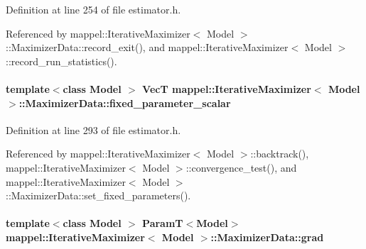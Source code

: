Definition at line 254 of file estimator.\+h.



Referenced by mappel\+::\+Iterative\+Maximizer$<$ Model $>$\+::\+Maximizer\+Data\+::record\+\_\+exit(), and mappel\+::\+Iterative\+Maximizer$<$ Model $>$\+::record\+\_\+run\+\_\+statistics().

\paragraph[{\texorpdfstring{fixed\+\_\+parameter\+\_\+scalar}{fixed_parameter_scalar}}]{\setlength{\rightskip}{0pt plus 5cm}template$<$class Model $>$ {\bf VecT} {\bf mappel\+::\+Iterative\+Maximizer}$<$ Model $>$\+::Maximizer\+Data\+::fixed\+\_\+parameter\+\_\+scalar}\hypertarget{classmappel_1_1IterativeMaximizer_1_1MaximizerData_af078e8d5506273857fd7c2ffad69f8da}{}\label{classmappel_1_1IterativeMaximizer_1_1MaximizerData_af078e8d5506273857fd7c2ffad69f8da}


Definition at line 293 of file estimator.\+h.



Referenced by mappel\+::\+Iterative\+Maximizer$<$ Model $>$\+::backtrack(), mappel\+::\+Iterative\+Maximizer$<$ Model $>$\+::convergence\+\_\+test(), and mappel\+::\+Iterative\+Maximizer$<$ Model $>$\+::\+Maximizer\+Data\+::set\+\_\+fixed\+\_\+parameters().

\paragraph[{\texorpdfstring{grad}{grad}}]{\setlength{\rightskip}{0pt plus 5cm}template$<$class Model $>$ {\bf ParamT}$<$Model$>$ {\bf mappel\+::\+Iterative\+Maximizer}$<$ Model $>$\+::Maximizer\+Data\+::grad}\hypertarget{classmappel_1_1IterativeMaximizer_1_1MaximizerData_a3125e5d8ae4e2d4c4969ccb0187903fb}{}\label{classmappel_1_1IterativeMaximizer_1_1MaximizerData_a3125e5d8ae4e2d4c4969ccb0187903fb}


